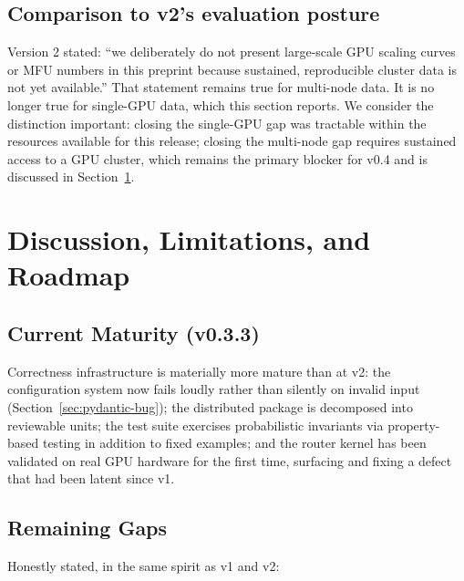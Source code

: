 \documentclass[11pt]{article}
\begin{document}
\subsection{Comparison to v2's evaluation posture}

Version 2 stated: ``we deliberately do not present large-scale GPU scaling
curves or MFU numbers in this preprint because sustained, reproducible
cluster data is not yet available.'' That statement remains true for
multi-node data. It is no longer true for single-GPU data, which this
section reports. We consider the distinction important: closing the
single-GPU gap was tractable within the resources available for this
release; closing the multi-node gap requires sustained access to a GPU
cluster, which remains the primary blocker for v0.4 and is discussed in
Section~\ref{sec:limitations}.

\section{Discussion, Limitations, and Roadmap}
\label{sec:limitations}

\subsection{Current Maturity (v0.3.3)}

Correctness infrastructure is materially more mature than at v2: the
configuration system now fails loudly rather than silently on invalid
input (Section~\ref{sec:pydantic-bug}); the distributed package is
decomposed into reviewable units; the test suite exercises probabilistic
invariants via property-based testing in addition to fixed examples; and
the router kernel has been validated on real GPU hardware for the first
time, surfacing and fixing a defect that had been latent since v1.

\subsection{Remaining Gaps}

Honestly stated, in the same spirit as v1 and v2:
\end{document}
